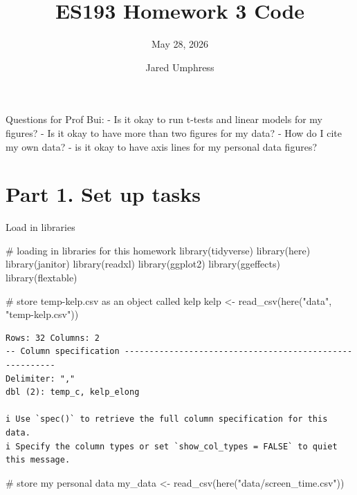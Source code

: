 \documentclass[
  letterpaper,
  DIV=11,
  numbers=noendperiod]{scrartcl}
\title{ES193 Homework 3 Code}
\subtitle{May 28, 2026}
\author{Jared Umphress}
\date{}
\newenvironment{Shaded}{\begin{snugshade}}{\end{snugshade}}
\newcommand{\CommentTok}[1]{\textcolor[rgb]{0.37,0.37,0.37}{#1}}
\newcommand{\FunctionTok}[1]{\textcolor[rgb]{0.28,0.35,0.67}{#1}}
\newcommand{\NormalTok}[1]{\textcolor[rgb]{0.00,0.23,0.31}{#1}}
\newcommand{\OtherTok}[1]{\textcolor[rgb]{0.00,0.23,0.31}{#1}}
\newcommand{\StringTok}[1]{\textcolor[rgb]{0.13,0.47,0.30}{#1}}
\begin{document}
\maketitle

Questions for Prof Bui: - Is it okay to run t-tests and linear models
for my figures? - Is it okay to have more than two figures for my data?
- How do I cite my own data? - is it okay to have axis lines for my
personal data figures?

\section{Part 1. Set up tasks}\label{part-1.-set-up-tasks}

Load in libraries

\begin{Shaded}
\begin{Highlighting}[]
\CommentTok{\# loading in libraries for this homework}
\FunctionTok{library}\NormalTok{(tidyverse)}
\FunctionTok{library}\NormalTok{(here)}
\FunctionTok{library}\NormalTok{(janitor)}
\FunctionTok{library}\NormalTok{(readxl)}
\FunctionTok{library}\NormalTok{(ggplot2)}
\FunctionTok{library}\NormalTok{(ggeffects)}
\FunctionTok{library}\NormalTok{(flextable)}
\end{Highlighting}
\end{Shaded}

\begin{Shaded}
\begin{Highlighting}[]
\CommentTok{\# store temp{-}kelp.csv as an object called kelp}
\NormalTok{kelp }\OtherTok{\textless{}{-}} \FunctionTok{read\_csv}\NormalTok{(}\FunctionTok{here}\NormalTok{(}\StringTok{"data"}\NormalTok{, }\StringTok{"temp{-}kelp.csv"}\NormalTok{))}
\end{Highlighting}
\end{Shaded}

\begin{verbatim}
Rows: 32 Columns: 2
-- Column specification --------------------------------------------------------
Delimiter: ","
dbl (2): temp_c, kelp_elong

i Use `spec()` to retrieve the full column specification for this data.
i Specify the column types or set `show_col_types = FALSE` to quiet this message.
\end{verbatim}

\begin{Shaded}
\begin{Highlighting}[]
\CommentTok{\# store my personal data }
\NormalTok{my\_data }\OtherTok{\textless{}{-}} \FunctionTok{read\_csv}\NormalTok{(}\FunctionTok{here}\NormalTok{(}\StringTok{"data/screen\_time.csv"}\NormalTok{))}
\end{Highlighting}
\end{Shaded}
\end{document}
